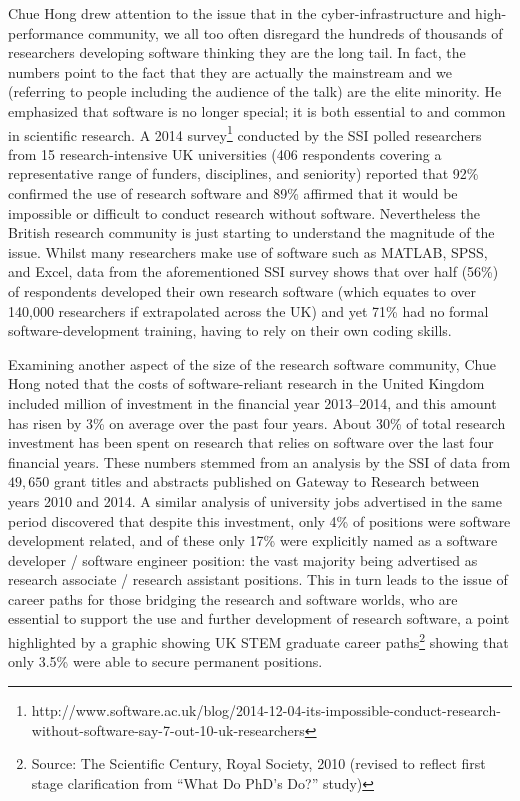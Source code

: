 \documentclass[11pt, oneside]{amsart}
\begin{document}
Chue Hong drew attention to the issue that in the cyber-infrastructure and
high-performance community, we all too often disregard the hundreds of thousands
of researchers developing software thinking they are the long tail. In fact, the
numbers point to the fact that they are actually the mainstream and we
(referring to people including the audience of the talk) are the elite minority.
He emphasized that software is no longer special; it is both essential to and
common in scientific research. A 2014
survey\footnote{http://www.software.ac.uk/blog/2014-12-04-its-impossible-conduct-research-without-software-say-7-out-10-uk-researchers}
conducted by the SSI polled researchers from 15 research-intensive UK
universities (406 respondents covering a representative range of funders,
disciplines, and seniority) reported that 92\% confirmed the use of research
software and 89\% affirmed that it would be impossible or difficult to conduct
research without software. Nevertheless the British research community is just
starting to understand the magnitude of the issue. Whilst many researchers make
use of software such as MATLAB, SPSS, and Excel, data from the aforementioned
SSI survey shows that over half (56\%) of respondents developed their own
research software (which equates to over 140,000 researchers if extrapolated
across the UK) and yet 71\% had no formal software-development training, having
to rely on their own coding skills.
 
Examining another aspect of the size of the research software community, 
Chue Hong noted that the costs of software-reliant research in the United Kingdom
included  million of investment in the financial year
2013--2014, and this amount has risen by 3\% on average over the past four
years. About 30\% of total research investment has been spent on research that
relies on software over the last four financial years. These numbers stemmed
from an analysis by the SSI of data from $49,650$ grant titles and abstracts published on
Gateway to Research between years 2010 and 2014. A similar analysis of university 
jobs advertised in the same period discovered that despite this investment, only
4\% of positions were software development related, and of these only 17\% were
explicitly named as a software developer / software engineer position: the vast
majority being advertised as research associate / research assistant positions.
This in turn leads to the issue of career paths for those bridging the research
and software worlds, who are essential to support the use and further
development of research software, a point highlighted by a graphic showing UK
STEM graduate career paths\footnote{Source: The Scientific Century, Royal
Society, 2010 (revised to reflect first stage clarification from ``What Do PhD's
Do?'' study)} showing that only 3.5\% were able to secure permanent positions. 
 
\end{document}
